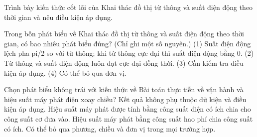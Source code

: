 \begin{bt}
Trình bày kiến thức cốt lõi của Khai thác đồ thị từ thông và suất điện động theo thời gian và nêu điều kiện áp dụng.
\end{bt}

\begin{ex}
Trong bốn phát biểu về Khai thác đồ thị từ thông và suất điện động theo thời gian, có bao nhiêu phát biểu đúng? (Chỉ ghi một số nguyên.) (1) Suất điện động lệch pha pi/2 so với từ thông; khi từ thông cực đại thì suất điện động bằng 0. (2) Từ thông và suất điện động luôn đạt cực đại đồng thời. (3) Cần kiểm tra điều kiện áp dụng. (4) Có thể bỏ qua đơn vị.
\end{ex}

\begin{ex}
Chọn phát biểu không trái với kiến thức về Bài toán thực tiễn về vận hành và hiệu suất máy phát điện xoay chiều?
\choice
{Kết quả không phụ thuộc dữ kiện và điều kiện áp dụng.}
{\True Hiệu suất máy phát được tính bằng công suất điện có ích chia cho công suất cơ đưa vào.}
{Hiệu suất máy phát bằng công suất hao phí chia công suất có ích.}
{Có thể bỏ qua phương, chiều và đơn vị trong mọi trường hợp.}
\end{ex}

